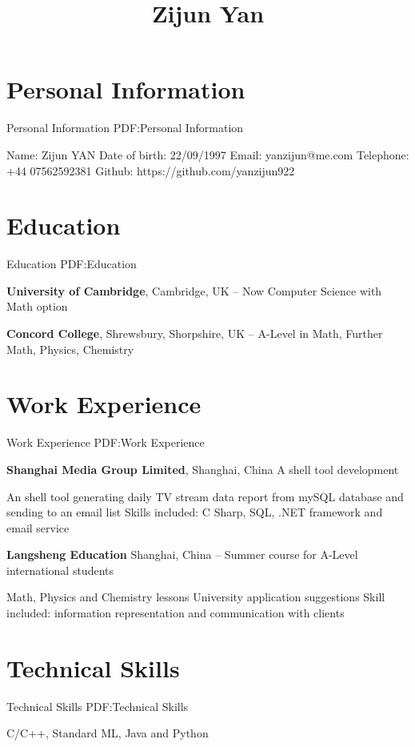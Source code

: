 \documentclass[letterpaper,10pt,oneside]{article}
\newcommand{\CVAuthor}{Zijun Yan}
\begin{document}
\title{\CVAuthor}
\begin{body}

\section
{Personal Information}
{Personal Information}
{PDF:Personal Information}

Name: Zijun YAN \newline
Date of birth: 22/09/1997 \newline
Email: yanzijun@me.com\newline
Telephone: +44 07562592381\newline
Github: https://github.com/yanzijun922

\section 
{Education}
{Education}
{PDF:Education}

\textbf{University of Cambridge},
Cambridge, UK
\hfill
{} --
Now
\GapNoBreak
\BulletItem
Computer Science with Math option
\GapNoBreak
\begin{detail}
\end{detail}



\BigGap
\textbf{Concord College},
Shrewsbury, Shorpshire, UK
\hfill
{} --
\GapNoBreak
\BulletItem
A-Level in Math, Further Math, Physics, Chemistry
\GapNoBreak
\begin{detail}
\end{detail}

\section
{Work Experience}
{Work Experience}
{PDF:Work Experience}

\textbf{Shanghai Media Group Limited},
Shanghai, China
\hfill
{}
\GapNoBreak
\BulletItem
A shell tool development
\GapNoBreak
\begin{detail}
\SubBulletItem
An shell tool generating daily TV stream data report from mySQL database and sending to an email list
\SubBulletItem
Skills included: C Sharp, SQL, .NET framework and email service
\end{detail}

\BigGap
\textbf{Langsheng Education}
Shanghai, China
\hfill
{} --
\GapNoBreak
\BulletItem
Summer course for A-Level international students
\GapNoBreak
\begin{detail}
\SubBulletItem
Math, Physics and Chemistry lessons
\SubBulletItem
University application suggestions
\SubBulletItem
Skill included: information representation and communication with clients
\end{detail}


\section
{Technical Skills}
{Technical Skills}
{PDF:Technical Skills}

\BulletItem C/C++, Standard ML, Java and Python

\end{body}
\end{document}
